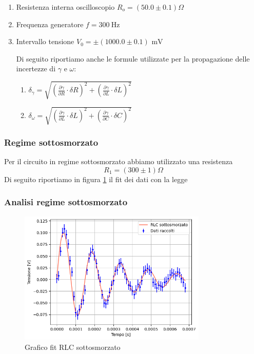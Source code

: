 \documentclass[letterpaper,12pt]{article}
\begin{document}
\begin{enumerate}[itemsep=1pt]
    \item Resistenza interna oscilloscopio $R_o = (50.0\pm0.1)\Omega$  
    \item Frequenza generatore $f = \SI{300}{\hertz}$
    \item Intervallo tensione $V_0= \pm (1000.0\pm0.1)\text{ mV}$ 

Di seguito riportiamo anche le formule utilizzate per la propagazione delle incertezze di $\gamma$ e $\omega$:

\begin{enumerate}
    \item $ \delta_{\gamma} = \sqrt{(\frac{\partial \gamma}{\partial R} \cdot \delta R)^2 + (\frac{\partial \gamma}{\partial L}\cdot \delta L)^2} $
    \item $ \delta_{\omega} = \sqrt{(\frac{\partial \gamma}{\partial L} \cdot \delta L)^2 + (\frac{\partial \gamma}{\partial C}\cdot \delta C)^2} $
\end{enumerate}
\end{enumerate}
\newpage

\subsubsection{Regime sottosmorzato}
Per il circuito in regime sottosmorzato abbiamo utilizzato una resistenza $$R_1 =(300\pm1) \Omega $$
Di seguito riportiamo in figura \ref{fig:fitRLCsotto} il fit dei dati con la legge 

\subsubsection{Analisi regime sottosmorzato}

\begin{figure}[h!] 
  \centering
  \includegraphics[width=0.8\textwidth]{RLCsotto.png} %
  \caption{Grafico fit RLC sottosmorzato}
  \label{fig:fitRLCsotto}
\end{figure}
\end{document}
